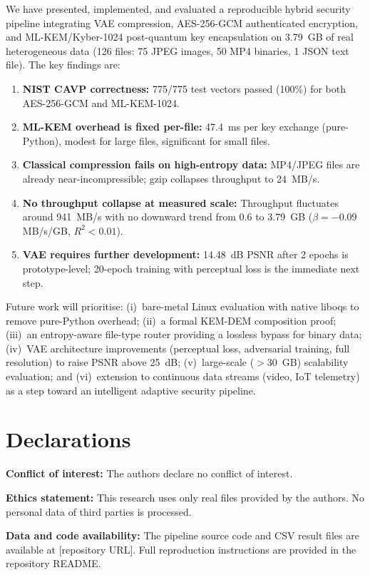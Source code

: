 \documentclass[twocolumn]{article}
\begin{document}
We have presented, implemented, and evaluated a reproducible hybrid security
pipeline integrating VAE compression, AES-256-GCM authenticated encryption, and
ML-KEM/Kyber-1024 post-quantum key encapsulation on 3.79~GB of real heterogeneous
data (126 files: 75 JPEG images, 50 MP4 binaries, 1 JSON text file). The key
findings are:

\begin{enumerate}
  \item \textbf{NIST CAVP correctness:} 775/775 test vectors passed (100\%) for
  both AES-256-GCM and ML-KEM-1024.
  \item \textbf{ML-KEM overhead is fixed per-file:} 47.4~ms per key exchange
  (pure-Python), modest for large files, significant for small files.
  \item \textbf{Classical compression fails on high-entropy data:} MP4/JPEG files
  are already near-incompressible; gzip collapses throughput to 24~MB/s.
  \item \textbf{No throughput collapse at measured scale:} Throughput fluctuates
  around 941~MB/s with no downward trend from 0.6 to 3.79~GB ($\beta = -0.09$
  MB/s/GB, $R^2 < 0.01$).
  \item \textbf{VAE requires further development:} 14.48~dB PSNR after 2 epochs
  is prototype-level; 20-epoch training with perceptual loss is the immediate
  next step.
\end{enumerate}

Future work will prioritise: (i)~bare-metal Linux evaluation with native liboqs
to remove pure-Python overhead; (ii)~a formal KEM-DEM composition proof; (iii)~an
entropy-aware file-type router providing a lossless bypass for binary data;
(iv)~VAE architecture improvements (perceptual loss, adversarial training, full
resolution) to raise PSNR above 25~dB; (v)~large-scale ($>$30~GB) scalability
evaluation; and (vi)~extension to continuous data streams (video, IoT telemetry)
as a step toward an intelligent adaptive security pipeline.

\section*{Declarations}

\textbf{Conflict of interest:} The authors declare no conflict of interest.

\textbf{Ethics statement:} This research uses only real files provided by the
authors. No personal data of third parties is processed.

\textbf{Data and code availability:} The pipeline source code and CSV result
files are available at [repository URL]. Full reproduction instructions are
provided in the repository README.
\end{document}

